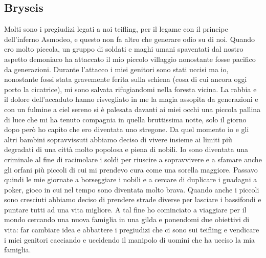 \documentclass{article}
\begin{document}
\subsection{Bryseis}Molti sono i pregiudizi legati a noi teifling, per il legame con il principe dell’inferno Asmodeo, e questo non fa altro che generare odio su di noi. Quando ero molto piccola, un gruppo di soldati e maghi umani spaventati dal nostro aspetto demoniaco ha attaccato il mio piccolo villaggio nonostante fosse pacifico da generazioni. Durante l’attacco i miei genitori sono stati uccisi ma io, nonostante fossi stata gravemente ferita sulla schiena (cosa di cui ancora oggi porto la cicatrice), mi sono salvata rifugiandomi nella foresta vicina. La rabbia e il dolore dell’accaduto hanno risvegliato in me la magia assopita da generazioni e con un fulmine a ciel sereno si è palesata davanti ai miei occhi una piccola pallina di luce che mi ha tenuto compagnia in quella bruttissima notte, solo il giorno dopo però ho capito che ero diventata uno stregone. Da quel momento io e gli altri bambini sopravvissuti abbiamo deciso di vivere insieme ai limiti più degradati di una città molto popolosa e piena di nobili. Io sono diventata una criminale al fine di racimolare i soldi per riuscire a sopravvivere e a sfamare anche gli orfani più piccoli di cui mi prendevo cura come una sorella maggiore. Passavo quindi le mie giornate a borseggiare i nobili e a cercare di duplicare i guadagni a poker, gioco in cui nel tempo sono diventata molto brava. Quando anche i piccoli sono cresciuti abbiamo deciso di prendere strade diverse per lasciare i bassifondi e puntare tutti ad una vita migliore. A tal fine ho cominciato a viaggiare per il mondo cercando una nuova famiglia in una gilda e ponendomi due obiettivi di vita: far cambiare idea e abbattere i pregiudizi che ci sono sui teifling e vendicare i miei genitori cacciando e uccidendo il manipolo di uomini che ha ucciso la mia famiglia. 
\end{document}
